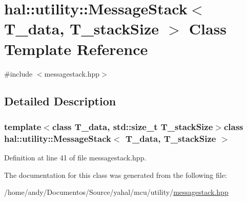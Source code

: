 \hypertarget{classhal_1_1utility_1_1_message_stack}{}\section{hal\+:\+:utility\+:\+:Message\+Stack$<$ T\+\_\+data, T\+\_\+stack\+Size $>$ Class Template Reference}
\label{classhal_1_1utility_1_1_message_stack}


{\ttfamily \#include $<$messagestack.\+hpp$>$}



\subsection{Detailed Description}
\subsubsection*{template$<$class T\+\_\+data, std\+::size\+\_\+t T\+\_\+stack\+Size$>$class hal\+::utility\+::\+Message\+Stack$<$ T\+\_\+data, T\+\_\+stack\+Size $>$}



Definition at line 41 of file messagestack.\+hpp.



The documentation for this class was generated from the following file\+:\begin{DoxyCompactItemize}
\item 
/home/andy/\+Documentos/\+Source/yahal/mcu/utility/\hyperlink{messagestack_8hpp}{messagestack.\+hpp}\end{DoxyCompactItemize}
